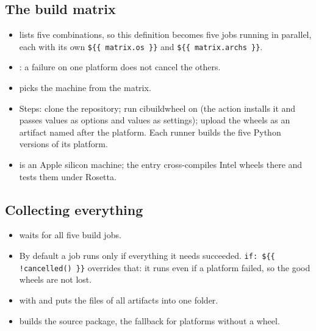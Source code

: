 \documentclass[11pt,a4paper]{article}
\newcommand{\filepiece}[3]{}
\begin{document}
\subsection{The build matrix}
\filepiece{job-wheels}{yaml}{The \code{wheels} job: one machine per platform}
\begin{itemize}
  \item {} lists five combinations, so this definition becomes five
        jobs running in parallel, each with its own \lstinline|${{ matrix.os }}| and
        \lstinline|${{ matrix.archs }}|.
  \item {}: a failure on one platform does not cancel the others.
  \item {} picks the machine from the matrix.
  \item Steps: clone the repository; run cibuildwheel on  (the action installs it and
        passes  values as options and  values as  settings);
        upload the wheels as an artifact named after the platform. Each runner builds the five
        Python versions of its platform.
  \item {} is an Apple silicon machine; the  entry cross-compiles Intel
        wheels there and tests them under Rosetta.
\end{itemize}

\subsection{Collecting everything}
\filepiece{job-collect}{yaml}{The \code{collect} job: every wheel and the sdist in one artifact}
\begin{itemize}
  \item {} waits for all five build jobs.
  \item By default a job runs only if everything it needs succeeded. \lstinline|if: ${{ !cancelled() }}|
        overrides that: it runs even if a platform failed, so the good wheels are not lost.
  \item {} with  and  puts the files of all
         artifacts into one folder.
  \item {} builds the source package, the fallback for platforms without
        a wheel.
\end{itemize}
\end{document}

